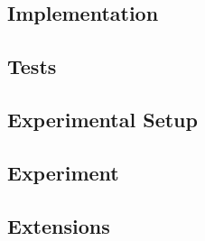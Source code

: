 \documentclass[a4paper,11pt]{article}
\begin{document}
\subsection{Implementation}
\label{sec:pt1}

\subsection{Tests}
\label{sec:pt2}

\subsection{Experimental Setup}
\label{sec:pt3}

\subsection{Experiment}
\label{sec:pt4}

\subsection{Extensions}
\label{sec:pt5}
\end{document}

